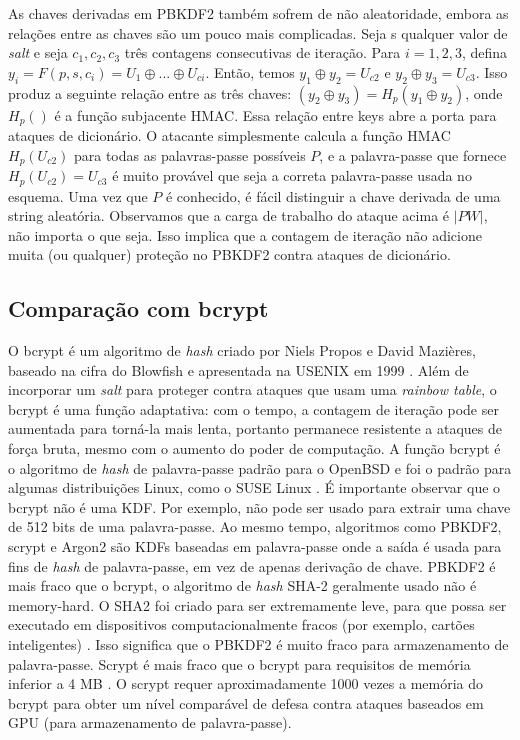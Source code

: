 \documentclass[conference]{IEEEtran}
\begin{document}
As chaves derivadas em PBKDF2 também sofrem de não aleatoridade, embora as relações 
entre as chaves são um pouco mais complicadas. Seja s qualquer valor de \textit{salt}
e seja $c_1, c_2, c_3$ três contagens consecutivas de iteração. Para $i = 1, 2, 3$, defina
$y_i = F (p, s, c_i) = U_1 \oplus ... \oplus U_{ci}$. Então, temos $y_1 \oplus y_2 = U_{c2}$ e $y_2 \oplus y_3 = U_{c3}$.
Isso produz a seguinte relação entre as três chaves: $(y_2 \oplus y_3) = H_p (y_1 \oplus y_2)$,
onde $H_p()$ é a função subjacente HMAC.
Essa relação entre keys abre a porta para ataques de dicionário. O atacante simplesmente 
calcula a função HMAC $H_p (U_{c2})$ para todas as palavras-passe possíveis $P$, e a palavra-passe que 
fornece $H_p (U_{c2}) = U_{c3}$ é muito provável que seja a correta
palavra-passe usada no esquema. Uma vez que $P$ é conhecido, é fácil distinguir a
chave derivada de uma string aleatória. Observamos que a carga de trabalho do ataque acima 
é $| P W |$, não importa o que seja. Isso implica que a contagem de iteração não
adicione muita (ou qualquer) proteção no PBKDF2 contra ataques de dicionário. \cite{Yao2005Design}

\subsection{Comparação com bcrypt}

O bcrypt é um algoritmo de \textit{hash} criado por Niels Propos e David Mazières, 
baseado na cifra do Blowfish e apresentada na USENIX em 1999 \cite{bcryptspec}. Além de incorporar 
um \textit{salt} para proteger contra ataques que usam uma \textit{rainbow table}, o bcrypt é 
uma função adaptativa: com o tempo, a contagem de iteração pode ser aumentada para 
torná-la mais lenta, portanto permanece resistente a ataques de força bruta, 
mesmo com o aumento do poder de computação.
A função bcrypt é o algoritmo de \textit{hash} de palavra-passe padrão para o OpenBSD \cite{bcryptbsd} e foi o padrão 
para algumas distribuições Linux, como o SUSE Linux \cite{bcryptsuse}.
É importante observar que o bcrypt não é uma KDF. Por exemplo, não pode ser usado 
para extrair uma chave de 512 bits de uma palavra-passe. 
Ao mesmo tempo, algoritmos como PBKDF2, scrypt e Argon2 são KDFs baseadas em palavra-passe 
onde a saída é usada para fins de \textit{hash} de palavra-passe, em vez de apenas derivação de chave.
PBKDF2 é mais fraco que o bcrypt, o algoritmo de \textit{hash} SHA-2 geralmente usado não é memory-hard. 
O SHA2 foi criado para ser extremamente leve, para que possa ser executado 
em dispositivos computacionalmente fracos (por exemplo, cartões inteligentes) \cite{SHS2002}. 
Isso significa que o PBKDF2 é muito fraco para armazenamento de palavra-passe. Scrypt é mais fraco que 
o bcrypt para requisitos de memória inferior a 4 MB \cite{anthony2014why}.
O scrypt requer aproximadamente 1000 vezes a memória do bcrypt para obter um nível 
comparável de defesa contra ataques baseados em GPU (para armazenamento de palavra-passe). \cite{bcryptwiki}
\end{document}
